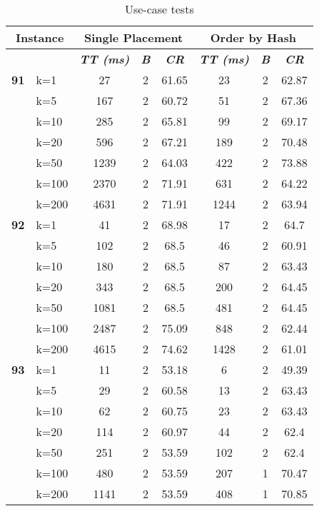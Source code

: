     \begin{table}[htbp]
    \caption{Use-case tests}
    \centering
    \begin{tabular}{|l|l|c|c|c|c|c|c|}
    
    \multicolumn{ 2}{|c|}{\textbf{Instance}} & \multicolumn{ 3}{c|}{\textbf{Single Placement}} & \multicolumn{ 3}{c|}{\textbf{Order by Hash}} \\ \hline
    \multicolumn{ 2}{|l|}{} & \textbf{\textit{TT (ms)}} & \textbf{\textit{B}} & \textbf{\textit{CR}} & \textbf{\textit{TT (ms)}} & \textbf{\textit{B}} & \textbf{\textit{CR}} \\ \hline
    \multicolumn{1}{|r|}{\textbf{91}} & k=1 & 27 & 2 & 61.65 & 23 & 2 & 62.87 \\ 
     & k=5 & 167 & 2 & 60.72 & 51 & 2 & 67.36 \\ 
     & k=10 & 285 & 2 & 65.81 & 99 & 2 & 69.17 \\ 
     & k=20 & 596 & 2 & 67.21 & 189 & 2 & 70.48 \\ 
     & k=50 & 1239 & 2 & 64.03 & 422 & 2 & 73.88 \\ 
     & k=100 & 2370 & 2 & 71.91 & 631 & 2 & 64.22 \\ 
     & k=200 & 4631 & 2 & 71.91 & 1244 & 2 & 63.94 \\ \hline
    \multicolumn{1}{|r|}{\textbf{92}} & k=1 & 41 & 2 & 68.98 & 17 & 2 & 64.7 \\ 
     & k=5 & 102 & 2 & 68.5 & 46 & 2 & 60.91 \\ 
     & k=10 & 180 & 2 & 68.5 & 87 & 2 & 63.43 \\ 
     & k=20 & 343 & 2 & 68.5 & 200 & 2 & 64.45 \\ 
     & k=50 & 1081 & 2 & 68.5 & 481 & 2 & 64.45 \\ 
     & k=100 & 2487 & 2 & 75.09 & 848 & 2 & 62.44 \\ 
     & k=200 & 4615 & 2 & 74.62 & 1428 & 2 & 61.01 \\ \hline
    \multicolumn{1}{|r|}{\textbf{93}} & k=1 & 11 & 2 & 53.18 & 6 & 2 & 49.39 \\ 
     & k=5 & 29 & 2 & 60.58 & 13 & 2 & 63.43 \\ 
     & k=10 & 62 & 2 & 60.75 & 23 & 2 & 63.43 \\ 
     & k=20 & 114 & 2 & 60.97 & 44 & 2 & 62.4 \\ 
     & k=50 & 251 & 2 & 53.59 & 102 & 2 & 62.4 \\ 
     & k=100 & 480 & 2 & 53.59 & 207 & 1 & 70.47 \\ 
     & k=200 & 1141 & 2 & 53.59 & 408 & 1 & 70.85 \\ \hline

\end{tabular}
\end{table}
